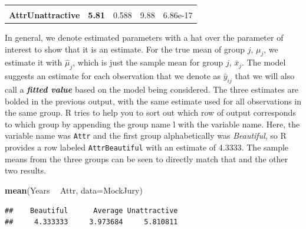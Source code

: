 \documentclass[]{book}
\newenvironment{Shaded}{\begin{snugshade}}{\end{snugshade}}
\newcommand{\KeywordTok}[1]{\textcolor[rgb]{0.13,0.29,0.53}{\textbf{#1}}}
\newcommand{\DataTypeTok}[1]{\textcolor[rgb]{0.13,0.29,0.53}{#1}}
\newcommand{\StringTok}[1]{\textcolor[rgb]{0.31,0.60,0.02}{#1}}
\newcommand{\OperatorTok}[1]{\textcolor[rgb]{0.81,0.36,0.00}{\textbf{#1}}}
\newcommand{\NormalTok}[1]{#1}
\begin{document}
\begin{longtable}[]{@{}ccccc@{}}
\begin{minipage}[t]{0.12\columnwidth}
\end{minipage}\tabularnewline
\begin{minipage}[t]{0.27\columnwidth}\centering\strut
\textbf{AttrUnattractive}\strut
\end{minipage} & \begin{minipage}[t]{0.13\columnwidth}\centering\strut
\textbf{5.81}\strut
\end{minipage} & \begin{minipage}[t]{0.16\columnwidth}\centering\strut
0.588\strut
\end{minipage} & \begin{minipage}[t]{0.12\columnwidth}\centering\strut
9.88\strut
\end{minipage} & \begin{minipage}[t]{0.12\columnwidth}\centering\strut
6.86e-17\strut
\end{minipage}\tabularnewline
\bottomrule
\end{longtable}

In general, we denote estimated parameters with a hat over the parameter
of interest to show that it is an estimate. For the true mean of group
\(j\), \(\mu_j\), we estimate it with \(\hat{\mu}_j\), which is just the
sample mean for group \(j\), \(\bar{x}_j\). The model suggests an
estimate for each observation that we denote as \(\hat{y}_{ij}\) that we
will also call a \textbf{\emph{fitted value}} based on the model being
considered. The three estimates are bolded in the previous output, with
the same estimate used for all observations in the same group. R tries
to help you to sort out which row of output corresponds to which group
by appending the group name l with the variable name. Here, the variable
name was \texttt{Attr} and the first group alphabetically was
\emph{Beautiful}, so R provides a row labeled \texttt{AttrBeautiful}
with an estimate of 4.3333. The sample means from the three groups can
be seen to directly match that and the other two results.

\begin{Shaded}
\begin{Highlighting}[]
\KeywordTok{mean}\NormalTok{(Years }\OperatorTok{~}\StringTok{ }\NormalTok{Attr, }\DataTypeTok{data=}\NormalTok{MockJury)}
\end{Highlighting}
\end{Shaded}

\begin{verbatim}
##    Beautiful      Average Unattractive 
##     4.333333     3.973684     5.810811
\end{verbatim}
\end{document}
